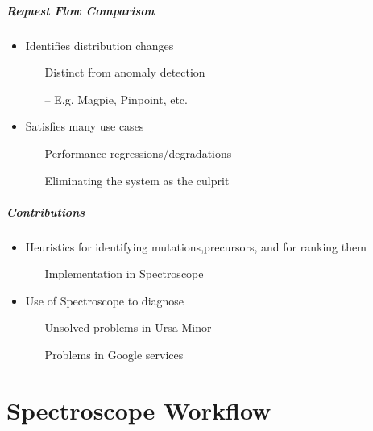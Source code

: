 \documentclass[11pt]{beamer}
\begin{document}
\begin{frame}
\frametitle{Request Flow Comparison}
\begin{itemize}
  \item<1-> Identifies distribution changes
  \begin{enumerate}
    \item[\ding{43}] Distinct from anomaly detection
    \item[--] E.g. Magpie, Pinpoint, etc.
  \end{enumerate}
  \vskip11pt
  \item<2> Satisfies many use cases
  \begin{enumerate}
    \item[\ding{43}]Performance regressions/degradations
    \item[\ding{43}]Eliminating the system as the culprit
  \end{enumerate}
\end{itemize}
\end{frame}

\begin{frame}
\frametitle{Contributions}
\begin{itemize}
  \item<1-> Heuristics for identifying mutations,precursors, and for ranking them
  \begin{enumerate}
    \item[\ding{45}] Implementation in Spectroscope
  \end{enumerate}
  \vskip11pt
  \item<2> Use of Spectroscope to diagnose
  \begin{enumerate}
    \item[\ding{44}]Unsolved problems in Ursa Minor
    \item[\ding{44}]Problems in Google services
  \end{enumerate}
\end{itemize}
\end{frame}

\part{Spectroscope Workflow}
\frame{\partpage}
\end{document}
